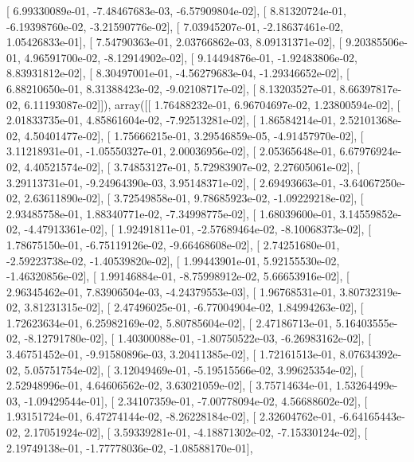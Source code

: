 \documentclass{article}
\begin{document}
       [  6.99330089e-01,  -7.48467683e-03,  -6.57909804e-02],
       [  8.81320724e-01,  -6.19398760e-02,  -3.21590776e-02],
       [  7.03945207e-01,  -2.18637461e-02,   1.05426833e-01],
       [  7.54790363e-01,   2.03766862e-03,   8.09131371e-02],
       [  9.20385506e-01,   4.96591700e-02,  -8.12914902e-02],
       [  9.14494876e-01,  -1.92483806e-02,   8.83931812e-02],
       [  8.30497001e-01,  -4.56279683e-04,  -1.29346652e-02],
       [  6.88210650e-01,   8.31388423e-02,  -9.02108717e-02],
       [  8.13203527e-01,   8.66397817e-02,   6.11193087e-02]]), array([[  1.76488232e-01,   6.96704697e-02,   1.23800594e-02],
       [  2.01833735e-01,   4.85861604e-02,  -7.92513281e-02],
       [  1.86584214e-01,   2.52101368e-02,   4.50401477e-02],
       [  1.75666215e-01,   3.29546859e-05,  -4.91457970e-02],
       [  3.11218931e-01,  -1.05550327e-01,   2.00036956e-02],
       [  2.05365648e-01,   6.67976924e-02,   4.40521574e-02],
       [  3.74853127e-01,   5.72983907e-02,   2.27605061e-02],
       [  3.29113731e-01,  -9.24964390e-03,   3.95148371e-02],
       [  2.69493663e-01,  -3.64067250e-02,   2.63611890e-02],
       [  3.72549858e-01,   9.78685923e-02,  -1.09229218e-02],
       [  2.93485758e-01,   1.88340771e-02,  -7.34998775e-02],
       [  1.68039600e-01,   3.14559852e-02,  -4.47913361e-02],
       [  1.92491811e-01,  -2.57689464e-02,  -8.10068373e-02],
       [  1.78675150e-01,  -6.75119126e-02,  -9.66468608e-02],
       [  2.74251680e-01,  -2.59223738e-02,  -1.40539820e-02],
       [  1.99443901e-01,   5.92155530e-02,  -1.46320856e-02],
       [  1.99146884e-01,  -8.75998912e-02,   5.66653916e-02],
       [  2.96345462e-01,   7.83906504e-03,  -4.24379553e-03],
       [  1.96768531e-01,   3.80732319e-02,   3.81231315e-02],
       [  2.47496025e-01,  -6.77004904e-02,   1.84994263e-02],
       [  1.72623634e-01,   6.25982169e-02,   5.80785604e-02],
       [  2.47186713e-01,   5.16403555e-02,  -8.12791780e-02],
       [  1.40300088e-01,  -1.80750522e-03,  -6.26983162e-02],
       [  3.46751452e-01,  -9.91580896e-03,   3.20411385e-02],
       [  1.72161513e-01,   8.07634392e-02,   5.05751754e-02],
       [  3.12049469e-01,  -5.19515566e-02,   3.99625354e-02],
       [  2.52948996e-01,   4.64606562e-02,   3.63021059e-02],
       [  3.75714634e-01,   1.53264499e-03,  -1.09429544e-01],
       [  2.34107359e-01,  -7.00778094e-02,   4.56688602e-02],
       [  1.93151724e-01,   6.47274144e-02,  -8.26228184e-02],
       [  2.32604762e-01,  -6.64165443e-02,   2.17051924e-02],
       [  3.59339281e-01,  -4.18871302e-02,  -7.15330124e-02],
       [  2.19749138e-01,  -1.77778036e-02,  -1.08588170e-01],
\end{document}
